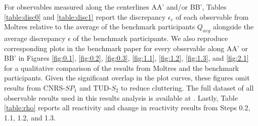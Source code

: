 For observables measured along the centerlines AA' and/or BB', Tables
\ref{table:disc0} and \ref{table:disc1} report the discrepancy $\epsilon_c$ of
each observable from Moltres relative to the average of the benchmark
participants $Q_{avg}$ alongside the average discrepancy $\epsilon$ of
the benchmark participants. We also reproduce corresponding plots
in the benchmark paper for every observable along AA' or BB' in Figures
\ref{fig:0.1}, \ref{fig:0.2}, \ref{fig:0.3}, \ref{fig:1.1}, \ref{fig:1.2},
\ref{fig:1.3}, and \ref{fig:2.1} for a qualitative comparison of the results
from Moltres and the benchmark participants. Given the significant overlap in
the plot curves, these figures omit results from CNRS-$SP_1$ and TUD-$S_2$ to
reduce cluttering. The full dataset
of all observable results used in this results analysis is
available at \cite{park_results_2021}. Lastly, Table
\ref{table:rho} reports all reactivity and change in reactivity results from
Steps 0.2, 1.1, 1.2, and 1.3.

